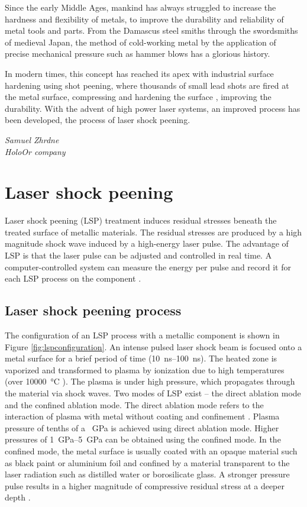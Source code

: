 \epigraph{Since the early Middle Ages, mankind has always struggled to increase the hardness and flexibility of metals, to improve the durability and reliability of  metal tools and parts. From the Damascus steel smiths through the swordsmiths of medieval Japan, the method of cold-working metal by the application of precise mechanical pressure such as hammer blows has a glorious history.

In modern times, this concept has reached its apex with industrial surface hardening using shot peening, where thousands of small lead shots are fired at the metal surface, compressing and hardening the surface , improving the durability. With the advent of high power laser systems, an improved process has been developed, the process of laser shock peening.}{\textit{Samuel Zhrdne\\ HoloOr company}}

\section{Laser shock peening}

Laser shock peening (LSP) treatment induces residual stresses beneath the treated surface of metallic materials. The residual stresses are produced by a high magnitude shock wave induced by a high-energy laser pulse. The advantage of LSP is that the laser pulse can be adjusted and controlled in real time. A computer-controlled system can measure the energy per pulse and record it for each LSP process on the component \cite{mannava}.

\subsection{Laser shock peening process}
The configuration of an LSP process with a metallic component is shown in Figure \ref{fig:lspconfiguration}. An intense pulsed laser shock beam is focused onto a metal surface for a brief period of time (\SIrange{10}{100}{\ns}). The heated zone is vaporized and transformed to plasma by ionization due to high temperatures (over \SI{10000}{\degreeCelsius} ). The plasma is under high pressure, which propagates through the material via shock waves. Two modes of LSP exist – the direct ablation mode and the confined ablation mode. The direct ablation mode refers to the interaction of plasma with metal without coating and confinement \cite{sano}. Plasma pressure of tenths of a \SI{}{\GPa} is achieved using direct ablation mode. Higher pressures of \SIrange{1}{5}{\GPa} can be obtained using the confined mode. In the confined mode, the metal surface is usually coated with an opaque material such as black paint or aluminium foil and confined by a material transparent to the laser radiation such as distilled water or borosilicate glass. A stronger pressure pulse results in a higher magnitude of compressive residual stress at a deeper depth \cite{fairland}.

